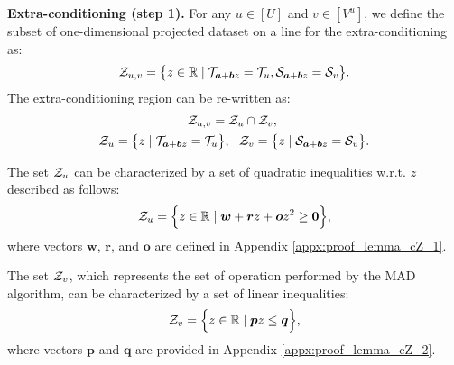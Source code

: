 \textbf{Extra-conditioning (step 1).} For any $u \in [U]$ and $v \in [V^u]$, we define the subset of one-dimensional projected dataset on a line for the extra-conditioning as:
%
\begin{align} \label{eq:cZ_extra_condition}
	{\mathcal Z}_{u, v} = 
	\big \{z \in \mathbb{R} 
	\mid 
	{\mathcal T}_{\bm a + \bm b z} = {\mathcal T}_u,
	{\mathcal S}_{\bm a + \bm b z} = {\mathcal S}_v 
	\big \}.
\end{align}
%
The extra-conditioning region can be re-written as:
%
\begin{align*}
	&{\mathcal Z}_{u, v}  = {\mathcal Z}_u \cap {\mathcal Z}_v, \\ 
	{\mathcal Z}_u  = 
	\big \{ 
	z
	\mid 
	{\mathcal T}_{\bm a + \bm b z} &= {\mathcal T}_u
	\big \},  ~ ~
	{\mathcal Z}_v = 
	\big \{ 
	z 
	\mid 
	{\mathcal S}_{\bm a + \bm b z} = {\mathcal S}_v
	\big \}.
\end{align*}
%
\begin{lemma} \label{lemma:cZ_1}
The set ${\mathcal Z}_u$ can be characterized by a set of quadratic inequalities w.r.t. $z$ described as follows:
\begin{align*}
	{\mathcal Z}_u
	= \Big \{ 
	z \in \mathbb{R} 
	\mid 
	\bm w + \bm r z + \bm o z^2 \geq \bm 0
	\Big \},
\end{align*}
%
where vectors $\bm w$, $\bm r$, and $\bm o$ are defined in Appendix \ref{appx:proof_lemma_cZ_1}.
\end{lemma}


\begin{lemma} \label{lemma:cZ_2}
The set ${\mathcal Z}_v$, which represents the set of operation performed by the MAD algorithm, can be characterized by a set of linear inequalities:
%
\begin{align} \label{eq:set_cZ_v}
	{\mathcal Z}_v
	= \Big \{ 
	z \in \mathbb{R} 
	\mid 
	\bm p z \leq \bm q
	\Big \},
\end{align}
%
where vectors $\bm p$ and $\bm q$ are provided in Appendix \ref{appx:proof_lemma_cZ_2}.

\end{lemma}


